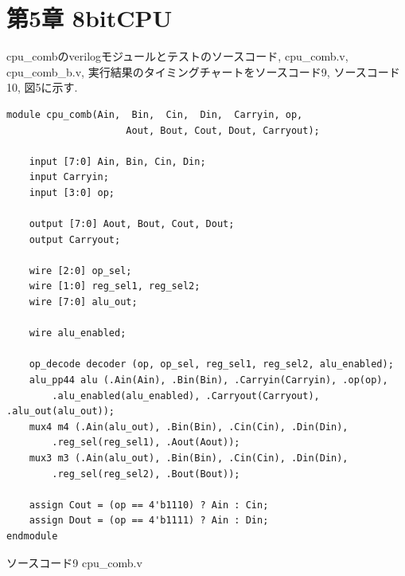 \documentclass[12pt]{jreport}
\begin{document}
    \chapter*{第5章 8bitCPU}
        cpu\_combのverilogモジュールとテストのソースコード, cpu\_comb.v, cpu\_comb\_b.v, 実行結果のタイミングチャートをソースコード9, ソースコード10, 図5に示す. 

        \begin{center}
            \begin{lstlisting}[basicstyle=\ttfamily\footnotesize, frame=single]
module cpu_comb(Ain,  Bin,  Cin,  Din,  Carryin, op,
                     Aout, Bout, Cout, Dout, Carryout);
    
    input [7:0] Ain, Bin, Cin, Din;
    input Carryin;
    input [3:0] op;
    
    output [7:0] Aout, Bout, Cout, Dout;
    output Carryout;

    wire [2:0] op_sel;
    wire [1:0] reg_sel1, reg_sel2;
    wire [7:0] alu_out;

    wire alu_enabled;

    op_decode decoder (op, op_sel, reg_sel1, reg_sel2, alu_enabled);
    alu_pp44 alu (.Ain(Ain), .Bin(Bin), .Carryin(Carryin), .op(op),
        .alu_enabled(alu_enabled), .Carryout(Carryout), .alu_out(alu_out));
    mux4 m4 (.Ain(alu_out), .Bin(Bin), .Cin(Cin), .Din(Din),
        .reg_sel(reg_sel1), .Aout(Aout));
    mux3 m3 (.Ain(alu_out), .Bin(Bin), .Cin(Cin), .Din(Din),
        .reg_sel(reg_sel2), .Bout(Bout));
    
    assign Cout = (op == 4'b1110) ? Ain : Cin;
    assign Dout = (op == 4'b1111) ? Ain : Din;
endmodule
            \end{lstlisting}
            ソースコード9 cpu\_comb.v
        \end{center}
    
\end{document}
